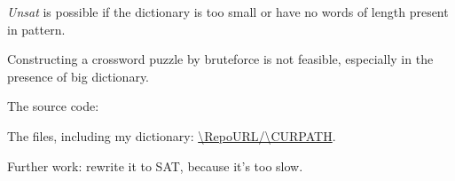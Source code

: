 \textit{Unsat} is possible if the dictionary is too small or have no words of length present in pattern.

Constructing a crossword puzzle by bruteforce is not feasible, especially in the presence of big dictionary.

The source code:



The files, including my dictionary: \url{\RepoURL/\CURPATH}.

Further work: rewrite it to SAT, because it's too slow.
